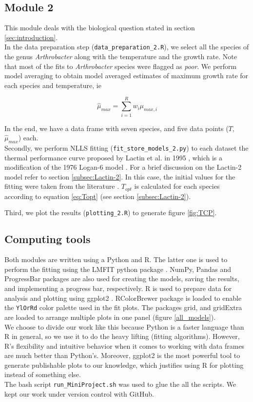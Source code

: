 \documentclass[titlepage,11pt]{article}
\begin{document}
\begin{linenumbers}
		\subsection{Module 2}
		This module deals with the biological question stated in section \ref{sec:introduction}. \\
		In the data preparation step (\verb|data_preparation_2.R|), we select all the species of the genus \textit{Arthrobacter} along with the temperature and the growth rate. Note that most of the fits to \textit{Arthrobacter} species were flagged as \textit{poor}. We perform model averaging to obtain model averaged estimates of maximum growth rate for each species and temperature, ie
		\begin{linenomath*}
			\begin{equation}
				\hat{\mu}_{max} = \sum\limits_{i = 1}^{R} w_i\mu_{max, i}
			\end{equation}
		\end{linenomath*}
		In the end, we have a data frame with seven species, and five data points ($ T $, $ \hat{\mu}_{max} $) each. \\
		Secondly, we perform NLLS fitting (\verb|fit_store_models_2.py|) to each dataset the thermal performance curve proposed by Lactin et al. in 1995 \cite{Lactin1995}, which is a modification of the 1976 Logan-6 model \cite{Logan1976}. For a brief discussion on the Lactin-2 model refer to section \ref{subsec:Lactin-2}. In this case, the initial values for the fitting were taken from the literature \cite{Lactin1995}. $ T_{opt} $ is calculated for each species according to equation \ref{eq:Topt} (see section \ref{subsec:Lactin-2}). 
		
		Third, we plot the results (\verb|plotting_2.R|) to generate figure \ref{fig:TCP}.
		\subsection{Computing tools}
		Both modules are written using a Python and R. The latter one is used to perform the fitting using the LMFIT python package \cite{Newville2014}. NumPy, Pandas \cite{Virtanen2020} and ProgressBar packages are also used for creating the models, saving the results, and implementing a progress bar, respectively. R is used to prepare data for analysis and plotting using ggplot2 \cite{Wickham2016}. RColorBrewer package is loaded to enable the \verb|YlOrRd| color palette used in the fit plots. The packages grid, and gridExtra are loaded to arrange multiple plots in one panel (figure \ref{all_models}).\\
		We choose to divide our work like this because Python is a faster language than R in general, so we use it to do the heavy lifting (fitting algorithms). However, R's flexibility and intuitive behavior when it comes to working with data frames are much better than Python's. Moreover, ggplot2 is the most powerful tool to generate publishable plots to our knowledge, which justifies using R for plotting instead of something else.\\
		The bash script \verb|run_MiniProject.sh| was used to glue the all the scripts. We kept our work under version control with GitHub.
		

\end{linenumbers}
\end{document}
